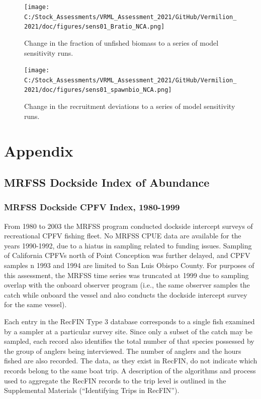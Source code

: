 \documentclass[
  english,
  a4paper,
]{article}
\begin{document}
\begin{figure}
\centering
\texttt{[image: C:/Stock\_Assessments/VRML\_Assessment\_2021/GitHub/Vermilion\_2021/doc/figures/sens01\_Bratio\_NCA.png]}
\caption{Change in the fraction of unfished biomass to a series of model sensitivity runs.\label{fig:sens1-bratio}}
\end{figure}

\begin{figure}
\centering
\texttt{[image: C:/Stock\_Assessments/VRML\_Assessment\_2021/GitHub/Vermilion\_2021/doc/figures/sens01\_spawnbio\_NCA.png]}
\caption{Change in the recruitment deviations to a series of model sensitivity runs.\label{fig:sens1-recdev}}
\end{figure}

\clearpage

\hypertarget{appendix}{%
\section{Appendix}\label{appendix}}

\hypertarget{mrfss-dockside-index-of-abundance}{%
\subsection{MRFSS Dockside Index of Abundance}\label{mrfss-dockside-index-of-abundance}}

\hypertarget{mrfss-dockside-cpfv-index-1980-1999}{%
\subsubsection{MRFSS Dockside CPFV Index, 1980-1999}\label{mrfss-dockside-cpfv-index-1980-1999}}

From 1980 to 2003 the MRFSS program conducted dockside intercept surveys of
recreational CPFV fishing fleet. No MRFSS CPUE data are available for the years
1990-1992, due to a hiatus in sampling related to funding issues. Sampling of
California CPFVs north of Point Conception was further delayed, and CPFV samples
n 1993 and 1994 are limited to San Luis Obispo County.
For purposes of this assessment, the MRFSS time series was truncated at 1999 due
to sampling overlap with the
onboard observer program (i.e., the same observer samples the catch while
onboard the vessel and also conducts the dockside intercept survey for
the same vessel).

Each entry in the RecFIN Type 3 database corresponds to a
single fish examined by a sampler at a particular survey site. Since only a
subset of the catch may be sampled, each record also
identifies the total number of that species possessed by the group of anglers
being interviewed. The number of anglers and the hours fished are also recorded.
The data, as they exist in RecFIN, do not indicate which records
belong to the same boat trip. A description of the algorithms and process used to
aggregate the RecFIN records to the trip level is outlined in the Supplemental Materials
(``Identifying Trips in RecFIN'').
\end{document}

